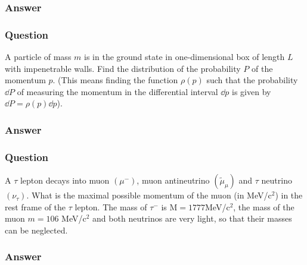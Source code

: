 \subsubsection{Answer}


\subsubsection{Question}
A particle of mass $m$ is in the ground state in one-dimensional box of length $L$ with impenetrable walls. Find the distribution of the probability $P$ of the momentum $p$. (This means finding the function $\rho(p)$ such that the probability $\dd P$ of measuring the momentum in the differential interval $\dd p$ is given by $\dd P = \rho(p) \dd p$).
\subsubsection{Answer}


\subsubsection{Question}
A $\tau$ lepton decays into muon $(\mu^-)$, muon antineutrino $(\tilde{\mu}_\mu)$ and $\tau$ neutrino $(\nu_\tau)$. What is the maximal possible momentum of the muon (in MeV/c$^2$) in the rest frame of the $\tau$ lepton. The mass of $\tau^-$ is M$ = 1777$MeV/c$^2$, the mass of the muon $m = 106$ MeV/c$^2$ and both neutrinos are very light, so that their masses can be neglected.
\subsubsection{Answer}

